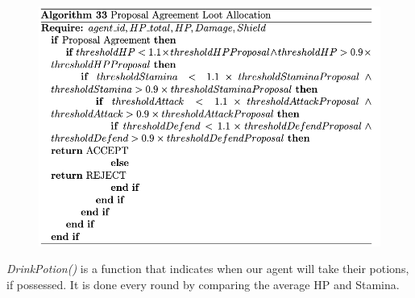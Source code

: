 
\begin{figure}[htb]
    \centering
    \includegraphics[scale=0.7]{006_team_3_agent_design/FIGS/Algo33.png}
    \label{fig:algo33}
\end{figure}


\textit{DrinkPotion()} is a function that indicates when our agent will take their potions, if possessed. It is done every round by comparing the average HP and Stamina.

